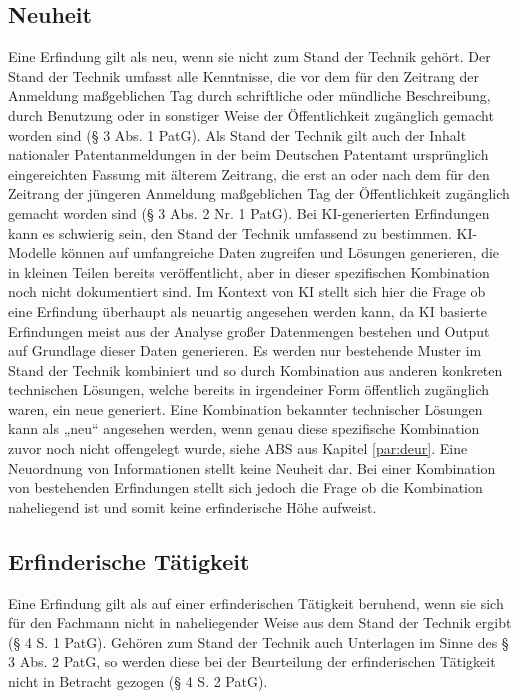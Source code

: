 \subsection{Neuheit}
Eine Erfindung gilt als neu, wenn sie nicht zum Stand der Technik gehört. 
Der Stand der Technik umfasst alle Kenntnisse, 
die vor dem für den Zeitrang der Anmeldung
maßgeblichen Tag durch schriftliche 
oder mündliche Beschreibung, durch Benutzung oder in
sonstiger Weise der Öffentlichkeit zugänglich gemacht worden sind (§ 3 Abs. 1 PatG).
Als Stand der Technik gilt auch der Inhalt nationaler Patentanmeldungen 
in der beim Deutschen
Patentamt ursprünglich eingereichten Fassung mit älterem Zeitrang, 
die erst an oder nach dem für
den Zeitrang der jüngeren Anmeldung maßgeblichen Tag der Öffentlichkeit 
zugänglich gemacht
worden sind (§ 3 Abs. 2 Nr. 1 PatG). 
Bei KI-generierten Erfindungen kann es schwierig sein, 
den Stand der Technik umfassend zu bestimmen. 
KI-Modelle können auf umfangreiche Daten zugreifen und Lösungen generieren, 
die in kleinen Teilen bereits veröffentlicht, 
aber in dieser spezifischen Kombination noch nicht dokumentiert sind.
Im Kontext von KI stellt sich hier die Frage 
ob eine Erfindung überhaupt als neuartig angesehen werden kann, 
da KI basierte Erfindungen meist aus der Analyse großer Datenmengen bestehen
und Output auf Grundlage dieser Daten generieren. 
Es werden nur bestehende Muster im Stand der Technik kombiniert 
und so durch Kombination aus anderen konkreten technischen Lösungen, 
welche bereits in irgendeiner Form öffentlich zugänglich waren, ein neue generiert.
Eine Kombination bekannter technischer Lösungen kann als „neu“ angesehen werden,
wenn genau diese spezifische Kombination zuvor noch nicht offengelegt wurde,
siehe ABS aus Kapitel \ref{par:deur}.
Eine Neuordnung von Informationen stellt keine Neuheit dar.
Bei einer Kombination von 
bestehenden Erfindungen stellt sich jedoch die Frage 
ob die Kombination naheliegend ist und
somit keine erfinderische Höhe aufweist. 


\subsection{Erfinderische Tätigkeit}


Eine Erfindung gilt als auf einer erfinderischen Tätigkeit beruhend, 
wenn sie sich für den Fachmann
nicht in naheliegender Weise aus dem Stand der Technik ergibt (§ 4 S. 1 PatG). 
Gehören zum Stand
der Technik auch Unterlagen im Sinne des § 3 Abs. 2 PatG, 
so werden diese bei der Beurteilung der
erfinderischen Tätigkeit nicht in Betracht gezogen (§ 4 S. 2 PatG).

